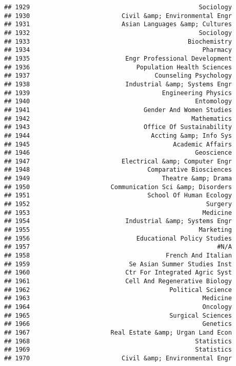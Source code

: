 \documentclass[
]{article}
\begin{document}
\begin{verbatim}
## 1929                                              Sociology
## 1930                         Civil &amp; Environmental Engr
## 1931                         Asian Languages &amp; Cultures
## 1932                                              Sociology
## 1933                                           Biochemistry
## 1934                                               Pharmacy
## 1935                          Engr Professional Development
## 1936                             Population Health Sciences
## 1937                                  Counseling Psychology
## 1938                          Industrial &amp; Systems Engr
## 1939                                    Engineering Physics
## 1940                                             Entomology
## 1941                               Gender And Women Studies
## 1942                                            Mathematics
## 1943                               Office Of Sustainability
## 1944                                 Accting &amp; Info Sys
## 1945                                       Academic Affairs
## 1946                                             Geoscience
## 1947                         Electrical &amp; Computer Engr
## 1948                                Comparative Biosciences
## 1949                                    Theatre &amp; Drama
## 1950                      Communication Sci &amp; Disorders
## 1951                                School Of Human Ecology
## 1952                                                Surgery
## 1953                                               Medicine
## 1954                          Industrial &amp; Systems Engr
## 1955                                              Marketing
## 1956                             Educational Policy Studies
## 1957                                                   #N/A
## 1958                                     French And Italian
## 1959                           Se Asian Summer Studies Inst
## 1960                          Ctr For Integrated Agric Syst
## 1961                          Cell And Regenerative Biology
## 1962                                      Political Science
## 1963                                               Medicine
## 1964                                               Oncology
## 1965                                      Surgical Sciences
## 1966                                               Genetics
## 1967                      Real Estate &amp; Urgan Land Econ
## 1968                                             Statistics
## 1969                                             Statistics
## 1970                         Civil &amp; Environmental Engr

\end{verbatim}
\end{document}
